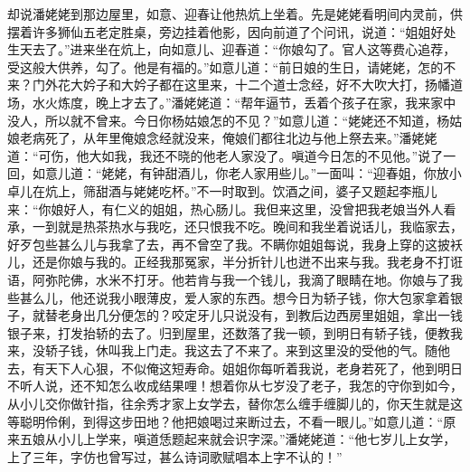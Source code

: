 却说潘姥姥到那边屋里，如意、迎春让他热炕上坐着。先是姥姥看明间内灵前，供摆着许多狮仙五老定胜桌，旁边挂着他影，因向前道了个问讯，说道：“姐姐好处生天去了。”进来坐在炕上，向如意儿、迎春道：“你娘勾了。官人这等费心追荐，受这般大供养，勾了。他是有福的。”如意儿道：“前日娘的生日，请姥姥，怎的不来？门外花大妗子和大妗子都在这里来，十二个道士念经，好不大吹大打，扬幡道场，水火炼度，晚上才去了。”潘姥姥道：“帮年逼节，丢着个孩子在家，我来家中没人，所以就不曾来。今日你杨姑娘怎的不见？”如意儿道：“姥姥还不知道，杨姑娘老病死了，从年里俺娘念经就没来，俺娘们都往北边与他上祭去来。”潘姥姥道：“可伤，他大如我，我还不晓的他老人家没了。嗔道今日怎的不见他。”说了一回，如意儿道：“姥姥，有钟甜酒儿，你老人家用些儿。”一面叫：“迎春姐，你放小卓儿在炕上，筛甜酒与姥姥吃杯。”不一时取到。饮酒之间，婆子又题起李瓶儿来：“你娘好人，有仁义的姐姐，热心肠儿。我但来这里，没曾把我老娘当外人看承，一到就是热茶热水与我吃，还只恨我不吃。晚间和我坐着说话儿，我临家去，好歹包些甚么儿与我拿了去，再不曾空了我。不瞒你姐姐每说，我身上穿的这披袄儿，还是你娘与我的。正经我那冤家，半分折针儿也迸不出来与我。我老身不打诳语，阿弥陀佛，水米不打牙。他若肯与我一个钱儿，我滴了眼睛在地。你娘与了我些甚么儿，他还说我小眼薄皮，爱人家的东西。想今日为轿子钱，你大包家拿着银子，就替老身出几分便怎的？咬定牙儿只说没有，到教后边西房里姐姐，拿出一钱银子来，打发抬轿的去了。归到屋里，还数落了我一顿，到明日有轿子钱，便教我来，没轿子钱，休叫我上门走。我这去了不来了。来到这里没的受他的气。随他去，有天下人心狠，不似俺这短寿命。姐姐你每听着我说，老身若死了，他到明日不听人说，还不知怎么收成结果哩！想着你从七岁没了老子，我怎的守你到如今，从小儿交你做针指，往余秀才家上女学去，替你怎么缠手缠脚儿的，你天生就是这等聪明伶俐，到得这步田地？他把娘喝过来断过去，不看一眼儿。”如意儿道：“原来五娘从小儿上学来，嗔道恁题起来就会识字深。”潘姥姥道：“他七岁儿上女学，上了三年，字仿也曾写过，甚么诗词歌赋唱本上字不认的！”

